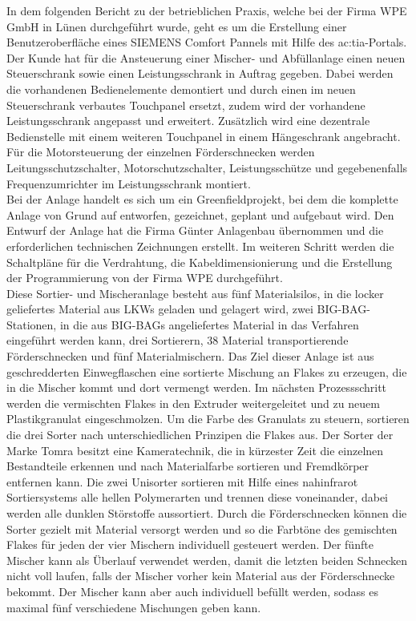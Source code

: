 In dem folgenden Bericht zu der betrieblichen Praxis, welche bei der Firma WPE GmbH in Lünen durchgeführt wurde, geht es um die Erstellung einer Benutzeroberfläche eines SIEMENS Comfort Pannels mit Hilfe des \gls{ac:tia}-Portals. \\
Der Kunde hat für die Ansteuerung einer Mischer- und Abfüllanlage einen neuen Steuerschrank sowie einen Leistungsschrank in Auftrag gegeben. Dabei werden die vorhandenen Bedienelemente demontiert und durch einen im neuen Steuerschrank verbautes Touchpanel ersetzt, zudem wird der vorhandene Leistungsschrank angepasst und erweitert. Zusätzlich wird eine dezentrale Bedienstelle mit einem weiteren Touchpanel in einem Hängeschrank angebracht. Für die Motorsteuerung der einzelnen Förderschnecken werden Leitungsschutzschalter, Motorschutzschalter, Leistungsschütze und gegebenenfalls Frequenzumrichter im Leistungsschrank montiert.\\ 
Bei der Anlage handelt es sich um ein Greenfieldprojekt, bei dem die komplette Anlage von Grund auf entworfen, gezeichnet, geplant und aufgebaut wird. Den Entwurf der Anlage hat die Firma Günter Anlagenbau übernommen und die erforderlichen technischen Zeichnungen erstellt. Im weiteren Schritt werden die Schaltpläne für die Verdrahtung, die Kabeldimensionierung und die Erstellung der Programmierung von der Firma WPE durchgeführt.\\
Diese Sortier- und Mischeranlage besteht aus fünf Materialsilos, in die locker geliefertes Material aus LKWs geladen und gelagert wird, zwei BIG-BAG-Stationen, in die aus BIG-BAGs angeliefertes Material in das Verfahren eingeführt werden kann, drei Sortierern, 38 Material transportierende Förderschnecken und fünf Materialmischern. Das Ziel dieser Anlage ist aus geschredderten Einwegflaschen eine sortierte Mischung an Flakes zu erzeugen, die in die Mischer kommt und dort vermengt werden. Im nächsten Prozessschritt werden die vermischten Flakes in den Extruder weitergeleitet und zu neuem Plastikgranulat eingeschmolzen. Um die Farbe des Granulats zu steuern, sortieren die drei Sorter nach unterschiedlichen Prinzipen die Flakes aus. Der Sorter der Marke Tomra besitzt eine Kameratechnik, die in kürzester Zeit die einzelnen Bestandteile erkennen und nach Materialfarbe sortieren und Fremdkörper entfernen kann. Die zwei Unisorter sortieren mit Hilfe eines nahinfrarot Sortiersystems alle hellen Polymerarten und trennen diese  voneinander, dabei werden alle dunklen Störstoffe aussortiert. Durch die Förderschnecken können die Sorter gezielt mit Material versorgt werden und so die Farbtöne des gemischten Flakes für jeden der vier Mischern individuell gesteuert werden. Der fünfte Mischer kann als Überlauf verwendet werden, damit die letzten beiden Schnecken nicht voll laufen, falls der Mischer vorher kein Material aus der Förderschnecke bekommt. Der Mischer kann aber auch individuell befüllt werden, sodass es maximal fünf verschiedene Mischungen geben kann.\\
